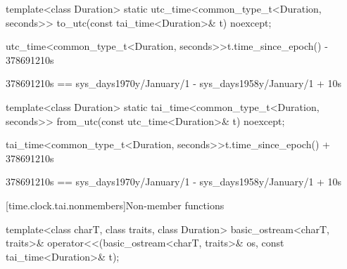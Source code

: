 %
\begin{itemdecl}
template<class Duration>
  static utc_time<common_type_t<Duration, seconds>>
    to_utc(const tai_time<Duration>& t) noexcept;
\end{itemdecl}

\begin{itemdescr}
\pnum
\returns
\begin{codeblock}
utc_time<common_type_t<Duration, seconds>>{t.time_since_epoch()} - 378691210s
\end{codeblock}
\begin{note}
\begin{codeblock}
378691210s == sys_days{1970y/January/1} - sys_days{1958y/January/1} + 10s
\end{codeblock}
\end{note}
\end{itemdescr}

%
\begin{itemdecl}
template<class Duration>
  static tai_time<common_type_t<Duration, seconds>>
    from_utc(const utc_time<Duration>& t) noexcept;
\end{itemdecl}

\begin{itemdescr}
\pnum
\returns
\begin{codeblock}
tai_time<common_type_t<Duration, seconds>>{t.time_since_epoch()} + 378691210s
\end{codeblock}
\begin{note}
\begin{codeblock}
378691210s == sys_days{1970y/January/1} - sys_days{1958y/January/1} + 10s
\end{codeblock}
\end{note}
\end{itemdescr}

[time.clock.tai.nonmembers]{Non-member functions}

%
\begin{itemdecl}
template<class charT, class traits, class Duration>
  basic_ostream<charT, traits>&
    operator<<(basic_ostream<charT, traits>& os, const tai_time<Duration>& t);
\end{itemdecl}

